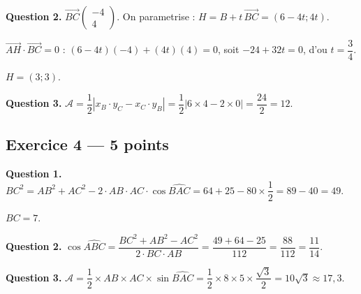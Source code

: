 \textbf{Question 2.}
$\overrightarrow{BC}\begin{pmatrix} -4 \\ 4 \end{pmatrix}$. On parametrise : $H = B + t\,\overrightarrow{BC} = (6 - 4t; 4t)$.

$\overrightarrow{AH} \cdot \overrightarrow{BC} = 0$ : $(6-4t)(-4) + (4t)(4) = 0$, soit $-24 + 32t = 0$, d'ou $t = \dfrac{3}{4}$.

$H = (3; 3)$.

\textbf{Question 3.}
$\mathcal{A} = \dfrac{1}{2} |x_B \cdot y_C - x_C \cdot y_B| = \dfrac{1}{2} |6 \times 4 - 2 \times 0| = \dfrac{24}{2} = 12$.

\subsection*{Exercice 4 — 5 points}


\textbf{Question 1.}
$BC^2 = AB^2 + AC^2 - 2 \cdot AB \cdot AC \cdot \cos\widehat{BAC} = 64 + 25 - 80 \times \dfrac{1}{2} = 89 - 40 = 49$.

$BC = 7$.

\textbf{Question 2.}
$\cos\widehat{ABC} = \dfrac{BC^2 + AB^2 - AC^2}{2 \cdot BC \cdot AB} = \dfrac{49 + 64 - 25}{112} = \dfrac{88}{112} = \dfrac{11}{14}$.

\textbf{Question 3.}
$\mathcal{A} = \dfrac{1}{2} \times AB \times AC \times \sin\widehat{BAC} = \dfrac{1}{2} \times 8 \times 5 \times \dfrac{\sqrt{3}}{2} = 10\sqrt{3} \approx 17{,}3$.


